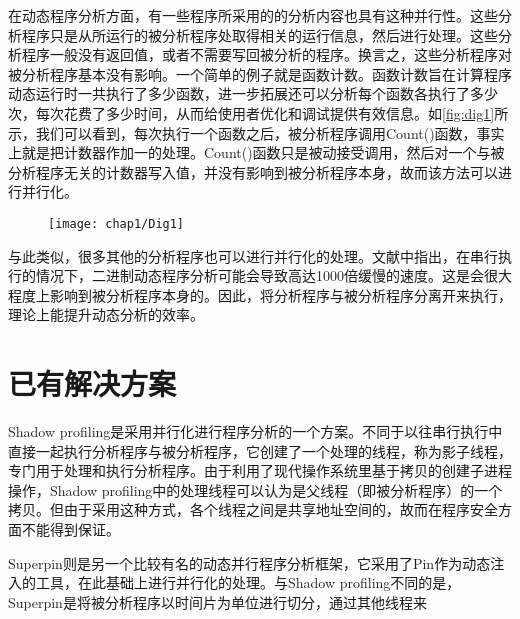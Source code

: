 在动态程序分析方面，有一些程序所采用的的分析内容也具有这种并行性。这些分析程序只是从所运行的被分析程序处取得相关的运行信息，然后进行处理。这些分析程序一般没有返回值，或者不需要写回被分析的程序。换言之，这些分析程序对被分析程序基本没有影响。一个简单的例子就是函数计数。函数计数旨在计算程序动态运行时一共执行了多少函数，进一步拓展还可以分析每个函数各执行了多少次，每次花费了多少时间，从而给使用者优化和调试提供有效信息。如\ref{fig:dig1}所示，我们可以看到，每次执行一个函数之后，被分析程序调用Count()函数，事实上就是把计数器作加一的处理。Count()函数只是被动接受调用，然后对一个与被分析程序无关的计数器写入值，并没有影响到被分析程序本身，故而该方法可以进行并行化。

\begin{figure}[!htp]
  \centering
  \texttt{[image: chap1/Dig1]}
\end{figure}

与此类似，很多其他的分析程序也可以进行并行化的处理。文献\cite{paSpeed}中指出，在串行执行的情况下，二进制动态程序分析可能会导致高达1000倍缓慢的速度。这是会很大程度上影响到被分析程序本身的。因此，将分析程序与被分析程序分离开来执行，理论上能提升动态分析的效率。

\section{已有解决方案}

Shadow profiling\cite{shaPro}是采用并行化进行程序分析的一个方案。不同于以往串行执行中直接一起执行分析程序与被分析程序，它创建了一个处理的线程，称为影子线程，专门用于处理和执行分析程序。由于利用了现代操作系统里基于拷贝的创建子进程操作，Shadow profiling中的处理线程可以认为是父线程（即被分析程序）的一个拷贝。但由于采用这种方式，各个线程之间是共享地址空间的，故而在程序安全方面不能得到保证。

Superpin\cite{superPin}则是另一个比较有名的动态并行程序分析框架，它采用了Pin作为动态注入的工具，在此基础上进行并行化的处理。与Shadow profiling不同的是，Superpin是将被分析程序以时间片为单位进行切分，通过其他线程来

